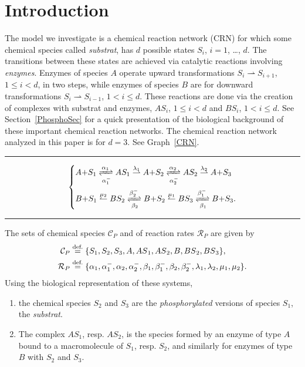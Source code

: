 \documentclass[english]{amsart}
\newcommand{\cal}[1]{\ensuremath{\mathcal{#1}}}
\newcommand\steq[1]{\stackrel{\text{\rm #1.}}{=}}
\numberwithin{proposition}{section}
\begin{document}
\section{Introduction}
The model we investigate  is a chemical reaction network (CRN) for which some chemical species called {\em substrat}, has $d$ possible states ${S}_i$, $i{=}1$, \ldots, $d$. The transitions between these states are achieved via catalytic reactions involving {\em enzymes}. Enzymes of species ${A}$ operate  upward transformations ${ S}_i{\rightharpoonup}{ S}_{i+1}$, $1{\le}i{<}d$, in two steps, while enzymes of species ${ B}$ are for  downward transformations ${ S}_i{\rightharpoonup}{ S}_{i-1}$, $1{<}i{\le}d$.
These reactions are done via the creation of complexes with substrat and enzymes, ${ AS}_i$, $1{\le}i{<}d$ and  ${ BS}_i$, $1{<}i{\le}d$. See Section~\ref{PhosphoSec} for a quick presentation of the biological background of these important chemical reaction networks. The chemical reaction network analyzed in this paper is for $d{=}3$. See Graph~\eqref{CRN}.

\medskip
\hrule
\begin{equation}\label{CRN}
\begin{cases*}
        A{+}S_1\mathrel{\mathop{\xrightleftharpoons[\alpha_{1}^-]{\alpha_{1}}}} AS_1\stackrel{\lambda_1}{\rightharpoonup} A{+}S_2 \mathrel{\mathop{\xrightleftharpoons[\alpha_{2}^-]{\alpha_{2}}}}  AS_2\stackrel{\lambda_2}{\rightharpoonup}A{+}S_3\\
         B{+}S_1\stackrel{\mu_2}{\leftharpoonup} BS_2\mathrel{\mathop{\xrightleftharpoons[\beta_{2}]{\beta_{2}^-}}}  B{+}S_{2} \stackrel{\mu_1}{\leftharpoonup}BS_3\mathrel{\mathop{\xrightleftharpoons[\beta_{1}]{\beta_{1}^-}}}   B{+}S_3.
\end{cases*}
\end{equation}
\hrule

\medskip
The sets of chemical species ${\cal C}_P$ and of reaction rates ${\cal R}_P$ are given by 
\begin{align}
{\cal C}_P&\steq{def} \{  { S}_1, { S}_2,{ S}_3, { A}, { AS}_1, { AS}_2,{ B}, { BS}_2, { BS}_3\},\label{CS}\\
{\cal R}_P&\steq{def} \{ \alpha_1,\alpha_1^-,\alpha_2,\alpha_2^-,\beta_1,\beta_1^-,\beta_2,\beta_2^-,\lambda_1,\lambda_2,\mu_1,\mu_2\}.\label{RR}
\end{align}
Using the biological representation of these systems,
\begin{enumerate}
\item the chemical species ${ S}_2$ and ${ S}_3$  are the {\em phosphorylated} versions of species ${ S}_1$, the {\em substrat}.
\item The complex ${ AS_1}$, resp. ${ AS_2}$, is the species formed by an enzyme of type ${ A}$ bound to a macromolecule of ${ S}_1$, resp. ${ S}_2$, and similarly for enzymes of type ${ B}$ with ${ S}_2$ and  ${ S}_3$.
\end{enumerate}
\end{document}
